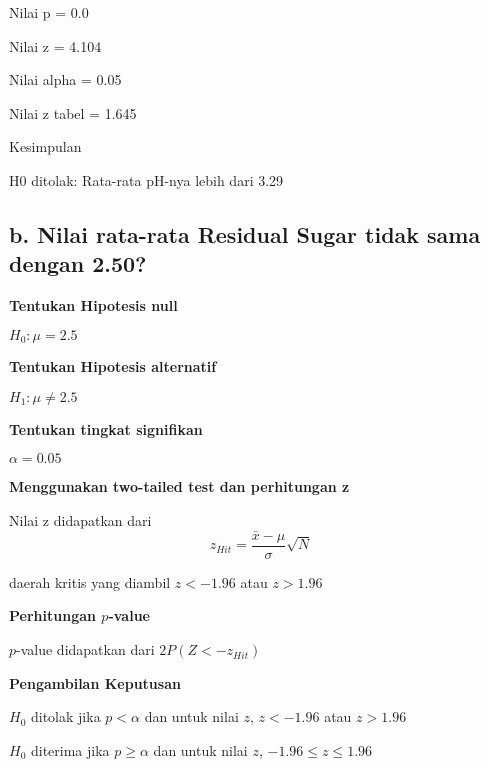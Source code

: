 \documentclass[11pt]{article}
\begin{document}
    Nilai p = 0.0

    
    Nilai z = 4.104

    
    Nilai alpha = 0.05

    
    Nilai z tabel = 1.645

    
    Kesimpulan

    
    H0 ditolak: Rata-rata pH-nya lebih dari 3.29

    
    \hypertarget{b.-nilai-rata-rata-residual-sugar-tidak-sama-dengan-2.50}{%
\subsection{b. Nilai rata-rata Residual Sugar tidak sama dengan
2.50?}\label{b.-nilai-rata-rata-residual-sugar-tidak-sama-dengan-2.50}}

    \textbf{Tentukan Hipotesis null}

\(H_0 : \mu = 2.5\)

\textbf{Tentukan Hipotesis alternatif}

\(H_1 : \mu \neq 2.5\)

\textbf{Tentukan tingkat signifikan}

\(\alpha = 0.05\)

\textbf{Menggunakan two-tailed test dan perhitungan z}

Nilai z didapatkan dari
\[ z_{Hit} = \frac{\bar{x}-\mu}{\sigma}  \sqrt{N}\]

daerah kritis yang diambil \(z < -1.96\) atau \(z > 1.96\)

\textbf{Perhitungan \(p\)-value}

\(p\)-value didapatkan dari \(2P(Z<-z_{Hit})\)

\textbf{Pengambilan Keputusan}

\(H_0\) ditolak jika \(p < \alpha\) dan untuk nilai \(z\), \(z < -1.96\)
atau \(z > 1.96\)

\(H_0\) diterima jika \(p \geq \alpha\) dan untuk nilai \(z\),
\(-1.96 \leq z \leq 1.96\)
\end{document}
